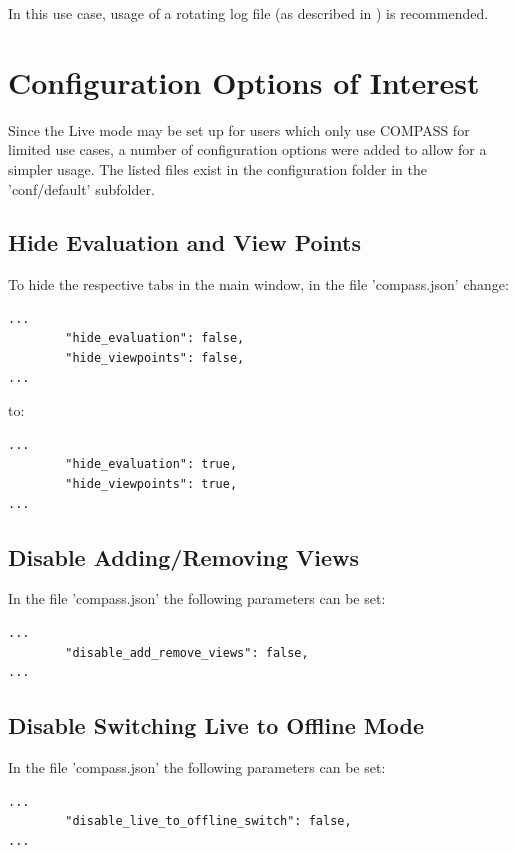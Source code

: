 In this use case, usage of a rotating log file (as described in ) is recommended.

\section{Configuration Options of Interest}

Since the Live mode may be set up for users which only use COMPASS for limited use cases, a number of configuration options were added to allow for a simpler usage. The listed files exist in the configuration folder in the 'conf/default' subfolder.

\subsection{Hide Evaluation and View Points}

To hide the respective tabs in the main window, in the file 'compass.json' change:

\begin{lstlisting}
...
        "hide_evaluation": false,
        "hide_viewpoints": false,
...        
\end{lstlisting}

to:
\begin{lstlisting}
...
        "hide_evaluation": true,
        "hide_viewpoints": true,
...        
\end{lstlisting}

\subsection{Disable Adding/Removing Views}

In the file 'compass.json' the following parameters can be set:

\begin{lstlisting}
...
        "disable_add_remove_views": false,
...        
\end{lstlisting}

\subsection{Disable Switching Live to Offline Mode}

In the file 'compass.json' the following parameters can be set:

\begin{lstlisting}
...
        "disable_live_to_offline_switch": false,
...        
\end{lstlisting}

